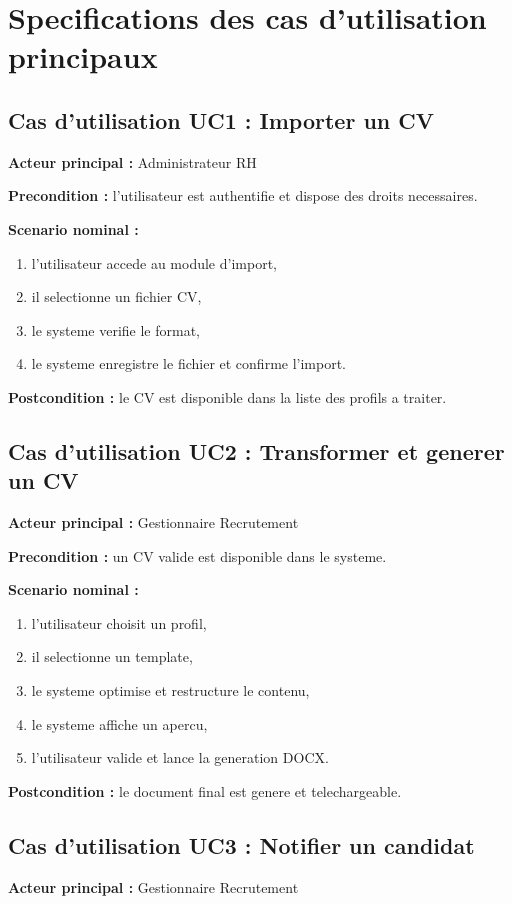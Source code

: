 \section{Specifications des cas d'utilisation principaux}
\subsection{Cas d'utilisation UC1 : Importer un CV}
\textbf{Acteur principal :} Administrateur RH

\textbf{Precondition :} l'utilisateur est authentifie et dispose des droits necessaires.

\textbf{Scenario nominal :}
\begin{enumerate}
    \item l'utilisateur accede au module d'import,
    \item il selectionne un fichier CV,
    \item le systeme verifie le format,
    \item le systeme enregistre le fichier et confirme l'import.
\end{enumerate}

\textbf{Postcondition :} le CV est disponible dans la liste des profils a traiter.

\subsection{Cas d'utilisation UC2 : Transformer et generer un CV}
\textbf{Acteur principal :} Gestionnaire Recrutement

\textbf{Precondition :} un CV valide est disponible dans le systeme.

\textbf{Scenario nominal :}
\begin{enumerate}
    \item l'utilisateur choisit un profil,
    \item il selectionne un template,
    \item le systeme optimise et restructure le contenu,
    \item le systeme affiche un apercu,
    \item l'utilisateur valide et lance la generation DOCX.
\end{enumerate}

\textbf{Postcondition :} le document final est genere et telechargeable.

\subsection{Cas d'utilisation UC3 : Notifier un candidat}
\textbf{Acteur principal :} Gestionnaire Recrutement

